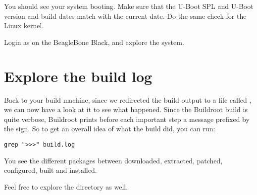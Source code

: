 You should see your system booting. Make sure that the U-Boot SPL and
U-Boot version and build dates match with the current date. Do the
same check for the Linux kernel.

Login as  on the BeagleBone Black, and explore the system.

\section{Explore the build log}

Back to your build machine, since we redirected the build output to a
file called , we can now have a look at it to see what
happened. Since the Buildroot build is quite verbose, Buildroot prints
before each important step a message prefixed by the \code{>>>}
sign. So to get an overall idea of what the build did, you can run:

\begin{verbatim}
grep ">>>" build.log
\end{verbatim}

You see the different packages between downloaded, extracted, patched,
configured, built and installed.

Feel free to explore the  directory as well.
